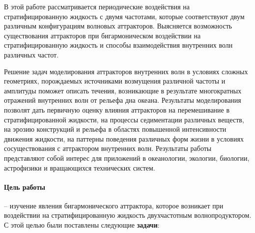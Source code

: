 \documentclass[utf8x]{G7-32} %
\begin{document}
В этой работе рассматривается периодические воздействия на стратифицированную жидкость с двумя частотами, которые соответствуют двум различным конфигурациям волновых аттракторов. Выясняется возможность существования аттракторов при бигармоническом воздействии на стратифицированную жидкость и способы взаимодействия внутренних волн различных частот. 

Решение задач моделирования аттракторов внутренних волн в условиях сложных геометриях, порождаемых источниками возмущения различной частоты и амплитуды поможет описать течения, возникающие в результате многократных отражений внутренних волн от рельефа дна океана. Результаты моделирования позволят дать первичную оценку влияния аттракторов на перемешивание в стратифицированной жидкости, на процессы седиментации различных веществ, на эрозию конструкций и рельефа в областях повышенной интенсивности движения жидкости, на паттерны поведения различных форм жизни в условиях сосуществования с аттрактором внутренних волн. Результаты работы представляют собой интерес для приложений в океанологии, экологии, биологии, астрофизики и вращающихся технических систем. 

\paragraph{Цель работы} -- изучение явления бигармонического аттрактора, которое возникает при воздействии на стратифицированную жидкость двухчастотным волнопродуктором.  
С этой целью были поставлены следующие \textbf{задачи}:
\end{document}
